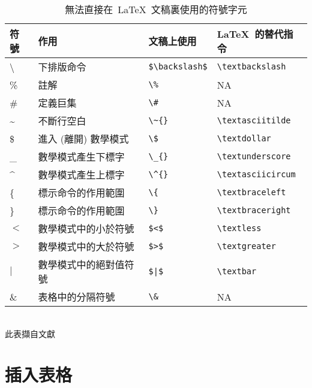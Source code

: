 \begin{table}[htbp] %
\caption{\label{tb:special_chars}%
\mbox{無法直接在 \LaTeX\ 文稿裏使用的符號字元}
}%
\begin{center} \begin{tabular}{llll}%
\hline 
符號&
作用&
文稿上使用&
\LaTeX\ 的替代指令\tabularnewline
\hline
\textbackslash &
下排版命令&
\verb+$\backslash$+&
\verb+\textbackslash+\tabularnewline
%
\%&
註解&
\verb+\%+&
NA\tabularnewline
%
\#&
定義巨集&
\verb+\#+&
NA\tabularnewline
%
\~{}&
不斷行空白&
\verb+\~{}+&
\verb+\textasciitilde+\tabularnewline
%
\$&
進入 (離開) 數學模式&
\verb+\$+&
\verb+\textdollar+\tabularnewline
%
\_{}&
數學模式產生下標字&
\verb+\_{}+&
\verb+\textunderscore+\tabularnewline
%
\^{}&
數學模式產生上標字&
\verb+\^{}+&
\verb+\textasciicircum+\tabularnewline
%
\{&
標示命令的作用範圍&
\verb+\{+&
\verb+\textbraceleft+\tabularnewline
%
\}&
標示命令的作用範圍&
\verb+\}+&
\verb+\textbraceright+\tabularnewline
%
$<$&
數學模式中的小於符號&
\verb+$<$+&
\verb+\textless+\tabularnewline
%
$>$&
數學模式中的大於符號&
\verb+$>$+&
\verb+\textgreater+\tabularnewline
%
$|$&
數學模式中的絕對值符號&
\verb+$|$+&
\verb+\textbar+\tabularnewline
%
\&&
表格中的分隔符號&
\verb+\&+&
NA\tabularnewline
%
\hline
\end{tabular}\\
此表擷自文獻\cite{lee_latex123}
\end{center}
\end{table}

\section{插入表格}
\label{sec:table}

